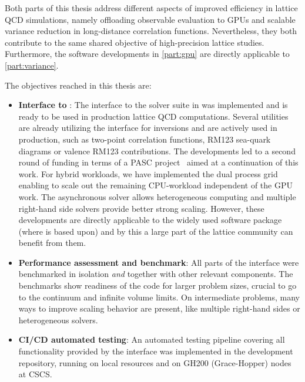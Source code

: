 
Both parts of this thesis address different aspects of improved efficiency in lattice QCD simulations, namely offloading observable evaluation to GPUs and scalable variance reduction in long-distance correlation functions.
Nevertheless, they both contribute to the same shared objective of high-precision lattice studies.
Furthermore, the software developments in \cref{part:gpu} are directly applicable to \cref{part:variance}.

The objectives reached in this thesis are: 
\begin{itemize}
   \item \textbf{Interface to \quda}: The interface to the solver suite in \quda was implemented and is ready to be used in production lattice QCD computations. Several utilities are already utilizing the interface for inversions and are actively used in production, such as two-point correlation functions, RM123 sea-quark diagrams or valence RM123 contributions. The developments led to a second round of funding in terms of a PASC project~\cite{online:pasc2025} aimed at a continuation of this work. For hybrid workloads, we have implemented the dual process grid enabling to scale out the remaining CPU-workload independent of the GPU work. The asynchronous solver allows heterogeneous computing and multiple right-hand side solvers provide better strong scaling. However, these developments are directly applicable to the widely used software package \openqcd (where \openqxd is based upon) and by this a large part of the lattice community can benefit from them.
   \item \textbf{Performance assessment and benchmark}: All parts of the interface were benchmarked in isolation \emph{and} together with other relevant components. The benchmarks show readiness of the code for larger problem sizes, crucial to go to the continuum and infinite volume limits. On intermediate problems, many ways to improve scaling behavior are present, like multiple right-hand sides or heterogeneous solvers.
   \item \textbf{CI/CD automated testing}: An automated testing pipeline covering all functionality provided by the interface was implemented in the development repository, running on local resources and on GH200 (Grace-Hopper) nodes at CSCS.

\end{itemize}
